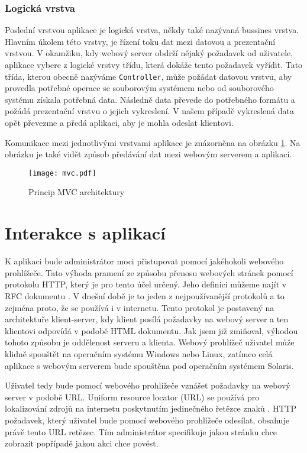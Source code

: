         \subsubsection{Logická vrstva}
        Poslední vrstvou aplikace je logická vrstva, někdy také nazývaná bussines vrstva. Hlavním úkolem této vrstvy, je řízení toku dat mezi datovou a prezentační vrstvou. V okamžiku, kdy webový server obdrží nějaký požadavek od uživatele, aplikace vybere z logické vrstvy třídu, která dokáže tento požadavek vyřídit. Tato třída, kterou obecně nazýváme \verb|Controller|, může požádat datovou vrstvu, aby provedla potřebné operace se souborovým systémem nebo od souborového systému získala potřebná data. Následně data převede do potřebného formátu a požádá prezentační vrstvu o jejich vykreslení. V našem případě vykreslená data opět převezme a předá aplikaci, aby je mohla odeslat klientovi.

        Komunikace mezi jednotlivými vrstvami aplikace je znázorněna na obrázku \ref{mvc}. Na obrázku je také vidět způsob předávání dat mezi webovým serverem a aplikací.

    \begin{figure}[h]
        \caption{Princip MVC architektury}
        \label{mvc}
        \centering
        \texttt{[image: mvc.pdf]}
    \end{figure}
\section{Interakce s aplikací}
K aplikaci bude administrátor moci přistupovat pomocí jakéhokoli webového prohlížeče. Tato výhoda pramení ze způsobu přenosu webových stránek pomocí protokolu HTTP, který je pro tento účel určený. Jeho definici můžeme najít v RFC dokumentu \cite{RFC2616}. V dnešní době je to jeden z nejpoužívanější protokolů a to zejména proto, že se používá i v internetu. Tento protokol je postavený na architektuře klient-server, kdy klient posílá požadavky na webový server a ten klientovi odpovídá v podobě HTML dokumentu. Jak jsem již zmiňoval, výhodou tohoto způsobu je oddělenost serveru a klienta. Webový prohlížeč uživatel může klidně spouštět na operačním systému Windows nebo Linux, zatímco celá aplikace s webovým serverem bude spouštěna pod operačním systémem Solaris.

Uživatel tedy bude pomocí webového prohlížeče vznášet požadavky na webový server v podobě URL. Uniform resource locator (URL) se používá pro lokalizování zdrojů na internetu poskytnutím jedinečného řetězce znaků \cite{RFC3986}. HTTP požadavek, který uživatel bude pomocí webového prohlížeče odesílat, obsahuje právě tento URL retězec. Tím administrátor specifikuje jakou stránku chce zobrazit popřípadě jakou akci chce povést.


